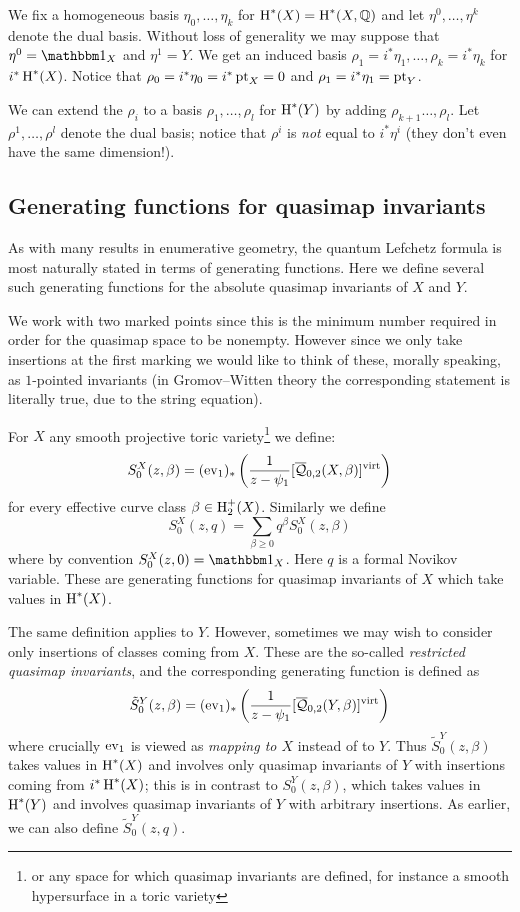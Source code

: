 We fix a homogeneous basis $\eta_0, \ldots, \eta_k$ for $\operatorname{H}^*(X) = \operatorname{H}^*(X,\mathbb{Q})$ and let $\eta^0, \ldots, \eta^k$ denote the dual basis. Without loss of generality we may suppose that $\eta^0=\mathbbm 1_X$ and $\eta^1=Y$. We get an induced basis $\rho_1=i^*\eta_1, \ldots, \rho_k = i^* \eta_k$ for $i^*\operatorname{H}^*(X)$. Notice that $\rho_0 = i^* \eta_0 = i^* \operatorname{pt}_X = 0$ and $\rho_1 = i^* \eta_1 = \operatorname{pt}_Y$.

We can extend the $\rho_i$ to a basis $\rho_1, \ldots, \rho_l$ for $\operatorname{H}^*(Y)$ by adding $\rho_{k+1}\ldots,\rho_{l}$. Let $\rho^1, \ldots, \rho^l$ denote the dual basis; notice that $\rho^i$ is \emph{not} equal to $i^* \eta^i$ (they don't even have the same dimension!).

\subsection{Generating functions for quasimap invariants}
As with many results in enumerative geometry, the quantum Lefchetz formula is most naturally stated in terms of generating functions. Here we define several such generating functions for the absolute quasimap invariants of $X$ and $Y$.

We work with two marked points since this is the minimum number required in order for the quasimap space to be nonempty. However since we only take insertions at the first marking we would like to think of these, morally speaking, as $1$-pointed invariants (in Gromov--Witten theory the corresponding statement is literally true, due to the string equation).

For $X$ any smooth projective toric variety\footnote{or any space for which quasimap invariants are defined, for instance a smooth hypersurface in a toric variety} we define: 
\begin{equation*} S_0^X(z,\beta)=(\operatorname{ev}_1)_*\left(\frac{1}{z-\psi_1} [\overline{\mathcal Q}_{0,2}(X,\beta)]^{\operatorname{virt}}\right) \end{equation*}
for every effective curve class $\beta\in \operatorname{H}_2^+(X)$. Similarly we define
\begin{equation*} S_0^X(z,q)=\sum_{\beta\geq 0} q^\beta S_0^X(z,\beta)\end{equation*}
where by convention $S_0^X(z,0)= \mathbbm 1_X$. Here $q$ is a formal Novikov variable. These are generating functions for quasimap invariants of $X$ which take values in $\operatorname{H}^*(X)$.

The same definition applies to $Y$. However, sometimes we may wish to consider only insertions of classes coming from $X$. These are the so-called \emph{restricted quasimap invariants}, and the corresponding generating function is defined as
\begin{equation*} \tilde{S}^Y_0(z,\beta) = (\operatorname{ev}_1)_* \left( \dfrac{1}{z-\psi_1} [\overline{\mathcal Q}_{0,2}(Y,\beta)]^{\operatorname{virt}} \right) \end{equation*}
where crucially $\operatorname{ev}_1$ is viewed as \emph{mapping to $X$} instead of to $Y$. Thus $\tilde{S}^Y_0(z,\beta)$ takes values in $\operatorname{H}^*(X)$ and involves only quasimap invariants of $Y$ with insertions coming from $i^*\operatorname{H}^*(X)$; this is in contrast to $S^Y_0(z,\beta)$, which takes values in $\operatorname{H}^*(Y)$ and involves quasimap invariants of $Y$ with arbitrary insertions. As earlier, we can also define $\tilde{S}_0^Y(z,q)$.


